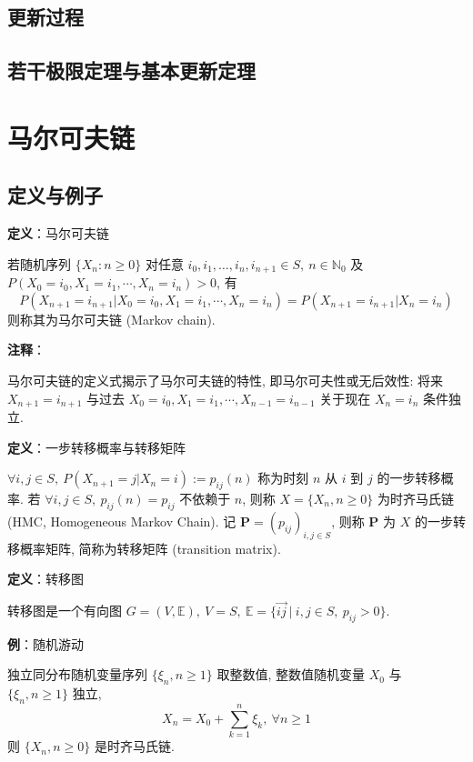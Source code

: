 \documentclass[openany]{ctexbook}
\theoremstyle{kaiti}
\theoremstyle{normal}
\begin{document}
\section{更新过程}
  
\section{若干极限定理与基本更新定理}

\chapter{马尔可夫链}

\section{定义与例子}

\textbf{定义}：马尔可夫链

若随机序列 $\{X_n:n\geqslant 0\}$ 对任意 $i_0,i_1,\ldots,i_n,i_{n+1}\in S,\ n\in\mathbb{N}_0$ 及 $P(X_0=i_0,X_1=i_1,\cdots,X_n=i_n)>0$, 有
\begin{equation}
  P(X_{n+1}=i_{n+1}|X_0=i_0,X_1=i_1,\cdots,X_n=i_n)=P(X_{n+1}=i_{n+1}|X_n=i_n)
\end{equation}
 则称其为马尔可夫链 (Markov chain).

\textbf{注释}：

马尔可夫链的定义式揭示了马尔可夫链的特性, 即马尔可夫性或无后效性: 将来 $X_{n+1}=i_{n+1}$ 与过去 $X_0=i_0,X_1=i_1,\cdots,X_{n-1}=i_{n-1}$ 关于现在 $X_n=i_n$ 条件独立.

\textbf{定义}：一步转移概率与转移矩阵

$\forall i,j\in S,\ P(X_{n+1}=j|X_n=i):=p_{ij}(n)$ 称为时刻 $n$ 从 $i$ 到 $j$ 的一步转移概率. 若 $\forall i,j\in S,\ p_{ij}(n)=p_{ij}$ 不依赖于 $n$, 则称 $X=\{X_n,n\geqslant 0\}$ 为时齐马氏链 (HMC, Homogeneous Markov Chain). 记 $\bm{P}=(p_{ij})_{i,j\in S}$, 则称 $\bm{P}$ 为 $X$ 的一步转移概率矩阵, 简称为转移矩阵 (transition matrix).

\textbf{定义}：转移图

转移图是一个有向图 $G=(V,\mathbb{E}),\ V=S,\ \mathbb{E}=\Big\{\overrightarrow{ij}~|~i,j\in S,~p_{ij}>0\Big\}$.

\textbf{例}：随机游动

独立同分布随机变量序列 $\{\xi_n,n\geqslant1\}$ 取整数值, 整数值随机变量 $X_0$ 与 $\{\xi_n,n\geqslant1\}$ 独立,
\begin{equation}
  X_n=X_0+\sum_{k=1}^n\xi_k,\ \forall n\geqslant1
\end{equation}
 则 $\{X_n,n\geqslant0\}$ 是时齐马氏链.
\end{document}
